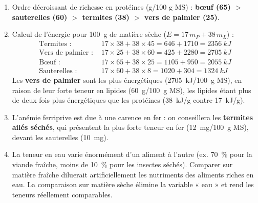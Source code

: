 \documentclass[11pt]{article}
\newcommand{\cle}[1]{{\popxbold\color{popdark}#1}}
\begin{document}
\begin{corrige}
\begin{enumerate}
\item Ordre décroissant de richesse en protéines (g/100 g MS) : \textbf{bœuf (65) $>$ sauterelles (60) $>$ termites (38) $>$ vers de palmier (25)}.
\item Calcul de l'énergie pour \SI{100}{g} de matière sèche ($E = 17\,m_P + 38\,m_L$) :
\begin{align*}
\text{Termites : } & 17 \times 38 + 38 \times 45 = 646 + 1710 = \SI{2356}{kJ} \\
\text{Vers de palmier : } & 17 \times 25 + 38 \times 60 = 425 + 2280 = \SI{2705}{kJ} \\
\text{Bœuf : } & 17 \times 65 + 38 \times 25 = 1105 + 950 = \SI{2055}{kJ} \\
\text{Sauterelles : } & 17 \times 60 + 38 \times 8 = 1020 + 304 = \SI{1324}{kJ}
\end{align*}
Les \textbf{vers de palmier} sont les plus énergétiques (\SI{2705}{kJ/100 g} MS), en raison de leur forte teneur en lipides (\SI{60}{g/100 g} MS), les lipides étant plus de deux fois plus énergétiques que les protéines (\SI{38}{kJ/g} contre \SI{17}{kJ/g}).
\item L'anémie ferriprive est due à une carence en fer : on conseillera les \textbf{termites ailés séchés}, qui présentent la plus forte teneur en fer (\SI{12}{mg/100 g} MS), devant les sauterelles (\SI{10}{mg}).
\item La teneur en eau varie énormément d'un aliment à l'autre (ex. \SI{70}{\percent} pour la viande fraîche, moins de \SI{10}{\percent} pour les insectes séchés). Comparer sur matière fraîche diluerait artificiellement les nutriments des aliments riches en eau. La comparaison sur \cle{matière sèche} élimine la variable « eau » et rend les teneurs réellement comparables.
\end{enumerate}
\end{corrige}
\end{document}
